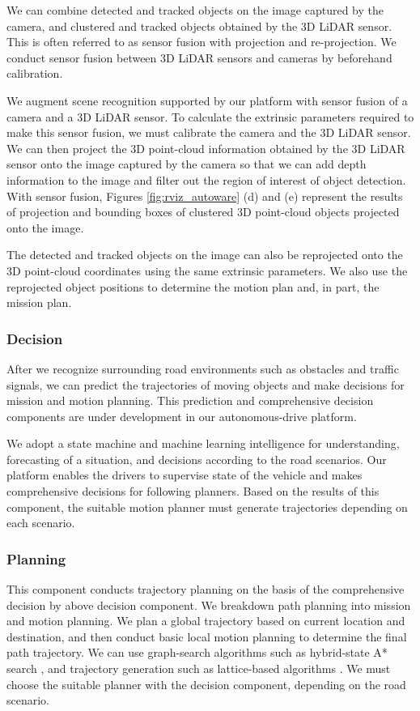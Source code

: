 We can combine detected and tracked objects on the image captured by the camera, and clustered and tracked objects obtained by the 3D LiDAR sensor.
This is often referred to as sensor fusion with projection and re-projection.
We conduct sensor fusion between 3D LiDAR sensors and cameras by beforehand calibration.

We augment scene recognition supported by our platform with sensor fusion of a camera and a 3D LiDAR sensor.
To calculate the extrinsic parameters required to make this sensor fusion, we must calibrate the camera and the 3D LiDAR sensor.
We can then project the 3D point-cloud information obtained by the 3D LiDAR sensor onto the image captured by the camera so that we can add depth information to the image and filter out the region of interest of object detection.
With sensor fusion, Figures \ref{fig:rviz_autoware} (d) and (e) represent the results of projection and bounding boxes of clustered 3D point-cloud objects projected onto the image.

The detected and tracked objects on the image can also be reprojected onto the 3D point-cloud coordinates using the same extrinsic parameters.
We also use the reprojected object positions to determine the motion plan and, in part, the mission plan.

\subsubsection{Decision}
\label{sec:decision}

After we recognize surrounding road environments such as obstacles and traffic signals, we can predict the trajectories of moving objects and make decisions for mission and motion planning.
This prediction and comprehensive decision components are under development in our autonomous-drive platform.

We adopt a state machine and machine learning intelligence for understanding, forecasting of a situation, and decisions according to the road scenarios.
Our platform enables the drivers to supervise state of the vehicle and makes comprehensive decisions for following planners.
Based on the results of this component, the suitable motion planner must generate trajectories depending on each scenario.

\subsubsection{Planning}
This component conducts trajectory planning on the basis of the comprehensive decision by above decision component.
We breakdown path planning into mission and motion planning.
We plan a global trajectory based on current location and destination, and then conduct basic local motion planning to determine the final path trajectory.
We can use graph-search algorithms such as hybrid-state A* search \cite{dolgov2010path}, and trajectory generation \cite{nagy2001trajectory} such as lattice-based algorithms \cite{darweesh2017open}.
We must choose the suitable planner with the decision component, depending on the road scenario.

